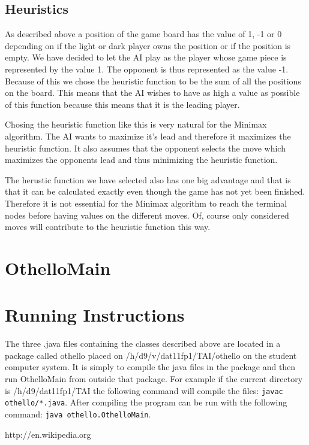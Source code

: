 \documentclass[a4paper]{article}
\begin{document}
\subsection{Heuristics}
As described above a position of the game board has the value of 1, -1 or 0 depending on if the light or dark player owns the position or if the position is empty. We have decided to let the AI play as the player whose game piece is represented by the value 1. The opponent is thus represented as the value -1. Because of this we chose the heuristic function to be the sum of all the positions on the board. This means that the AI wishes to have as high a value as possible of this function because this means that it is the leading player.

Chosing the heuristic function like this is very natural for the Minimax algorithm. The AI wants to maximize it's lead and therefore it maximizes the heuristic function. It also assumes that the opponent selects the move which maximizes the opponents lead and thus minimizing the heuristic function.

The herustic function we have selected also has one big advantage and that is that it can be calculated exactly even though the game has not yet been finished. Therefore it is not essential for the Minimax algorithm to reach the terminal nodes before having values on the different moves. Of, course only considered moves will contribute to the heuristic function this way.



\section{OthelloMain}

\section{Running Instructions}
The three .java files containing the classes described above are located in a package called othello placed on /h/d9/v/dat11fp1/TAI/othello on the student computer system. It is simply to compile the java files in the package and then run OthelloMain from outside that package. For example if the current directory is /h/d9/dat11fp1/TAI the following command will compile the files: \texttt{javac othello/*.java}. After compiling the program can be run with the following command: \texttt{java othello.OthelloMain}.

\begin{thebibliography}{1}
http://en.wikipedia.org
\end{thebibliography}
\end{document}
